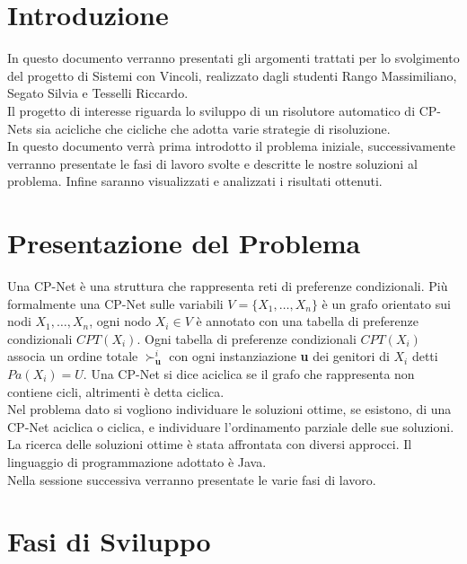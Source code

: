 \documentclass[a4paper,titlepage]{article}
\begin{document}
\tableofcontents

\newpage

\section{Introduzione}
In questo documento verranno presentati gli argomenti trattati per lo svolgimento del progetto di Sistemi con Vincoli, realizzato dagli studenti Rango Massimiliano, Segato Silvia e Tesselli Riccardo.\\Il progetto di interesse riguarda lo sviluppo di un risolutore automatico di CP-Nets sia acicliche che cicliche che adotta varie strategie di risoluzione.\\In questo documento verrà prima introdotto il problema iniziale, successivamente verranno presentate le fasi di lavoro svolte e descritte le nostre soluzioni al problema. Infine saranno visualizzati e analizzati i risultati ottenuti.

\section{Presentazione del Problema}
Una CP-Net è una struttura che rappresenta reti di preferenze condizionali. Più formalmente una CP-Net sulle variabili $V = \{X_{1},\dots, X_{n}\}$ è un grafo orientato sui nodi $X_{1},\dots, X_{n}$, ogni nodo $X_{i} \in V$ è annotato con una tabella di preferenze condizionali $CPT(X_{i})$. Ogni tabella di preferenze condizionali $CPT(X_{i})$ associa un ordine totale $\succ^{i}_{\textbf{u}}$ con ogni instanziazione \textbf{u} dei genitori di $X_{i}$ detti $Pa(X_{i}) = U$. Una CP-Net si dice aciclica se il grafo che rappresenta non contiene cicli, altrimenti è detta ciclica.\\
Nel problema dato si vogliono individuare le soluzioni ottime, se esistono, di una CP-Net aciclica o ciclica, e individuare l'ordinamento parziale delle sue soluzioni. La ricerca delle soluzioni ottime è stata affrontata con diversi approcci. Il linguaggio di programmazione adottato è Java.\\Nella sessione successiva verranno presentate le varie fasi di lavoro.


\section{Fasi di Sviluppo}
\end{document}

